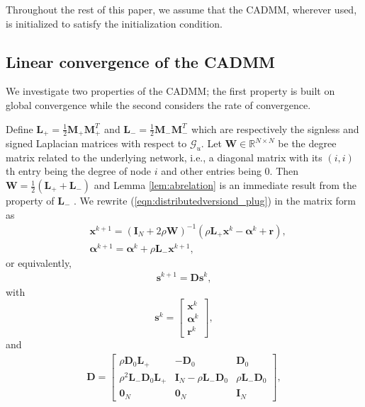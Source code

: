 \documentclass[journal]{IEEEtran}
\newcommand{\nn}{\nonumber}
\begin{document}
Throughout the rest of this paper, we assume that the CADMM, wherever used, is initialized to satisfy the initialization condition.

\subsection{Linear convergence of the CADMM}
\label{sec:LCofDCADMM}
We investigate two properties of the CADMM; the first property is built on global convergence while the second considers the rate of convergence. 

Define $\bm L_+=\frac{1}{2}\bm M_+\bm M_+^T$ and $\bm L_-=\frac{1}{2}\bm M_-\bm M_-^T$ which are respectively the signless and signed Laplacian matrices with respect to $\mathcal{G}_u$. Let $\bm W\in \mathbb{R}^{N\times N}$ be the degree matrix related to the underlying network, i.e., a diagonal matrix with its $(i,i)$th entry being the degree of node $i$ and other entries being $0$. Then $\bm W = \frac{1}{2}(\bm L_++\bm L_-)$  and Lemma \ref{lem:abrelation} is an immediate result from the property of $\bm L_-$ \cite{ChungSpectral}. We rewrite (\ref{eqn:distributedversiond_plug}) in the matrix form as
\begin{equation}
\label{eqn:idealdcadmm}
\begin{aligned}
&\bm x^{k+1}=(\bm I_N+2\rho \bm W)^{-1}( \rho \bm L_+ \bm x^k-\bm \alpha^k +\bm r),\\\nn
&\bm\alpha^{k+1} = \bm\alpha^k +\rho \bm L_-\bm x^{k+1},\nn
\end{aligned}
\end{equation}
or equivalently,
\begin{equation}
\label{eqn:iterateform}
\begin{aligned}
\bm s^{k+1}=\bm D\bm s^k,
\end{aligned}
\end{equation}
with 
$$\bm s^k = \left[\begin{array}{c} \bm x^{k}\\\bm\alpha^k\\\bm r{^k}\end{array}\right],$$and
\begin{equation}
\label{eqn:matrix_iterate}
\begin{aligned}
\bm D =\begin{bmatrix} \rho \bm D_0\bm L_+ & -\bm D_0& \bm D_0 \\ \rho^2 \bm L_-\bm D_0\bm L_+ & \bm I_N-\rho \bm L_-\bm D_0& \rho \bm L_-\bm D_0 \\\bm 0_N & \bm 0_N & \bm I_N \end{bmatrix},
\end{aligned}
\end{equation}
\end{document}
